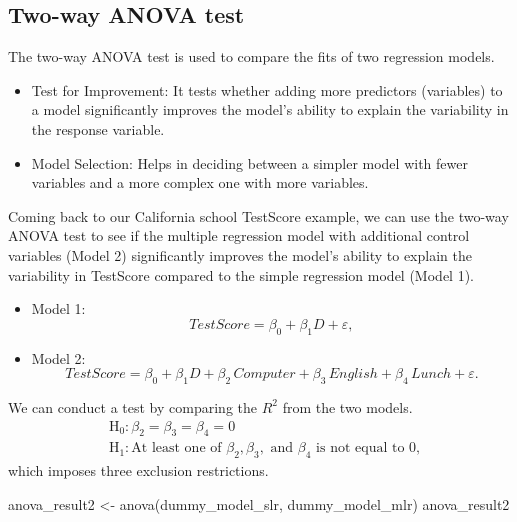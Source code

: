 \documentclass[
  12pt,
  a4paper,
]{scrbook}
\newenvironment{Shaded}{\begin{snugshade}}{\end{snugshade}}
\newcommand{\FunctionTok}[1]{\textcolor[rgb]{0.28,0.35,0.67}{#1}}
\newcommand{\NormalTok}[1]{\textcolor[rgb]{0.00,0.23,0.31}{#1}}
\newcommand{\OtherTok}[1]{\textcolor[rgb]{0.00,0.23,0.31}{#1}}
\providecommand{\tightlist}{%
  \setlength{\itemsep}{0pt}\setlength{\parskip}{0pt}}
\renewcommand{\tightlist}{\setlength{\itemsep}{0.5\baselineskip}\setlength{\parskip}{0.2\baselineskip}}
\theoremstyle{plain}
\theoremstyle{definition}
\theoremstyle{remark}
\begin{document}
\subsection{Two-way ANOVA test}\label{two-way-anova-test}

The two-way ANOVA test is used to compare the fits of two regression
models.

\begin{itemize}
\item
  Test for Improvement: It tests whether adding more predictors
  (variables) to a model significantly improves the model's ability to
  explain the variability in the response variable.
\item
  Model Selection: Helps in deciding between a simpler model with fewer
  variables and a more complex one with more variables.
\end{itemize}

Coming back to our California school TestScore example, we can use the
two-way ANOVA test to see if the multiple regression model with
additional control variables (Model 2) significantly improves the
model's ability to explain the variability in TestScore compared to the
simple regression model (Model 1).

\begin{itemize}
\tightlist
\item
  Model 1: \[
  TestScore = \beta_0 + \beta_1 D + \varepsilon,
  \]
\item
  Model 2:
  \[TestScore = \beta_0 + \beta_1 D + \beta_2\, Computer + \beta_3\, English + \beta_4\, Lunch + \varepsilon .
  \]
\end{itemize}

We can conduct a test by comparing the \(R^2\) from the two models. \[
\begin{aligned}
&\text{H}_0: \beta_2 = \beta_3 = \beta_4 = 0 \\
&\text{H}_1: \text{At least one of }\beta_2, \beta_3, \text{ and } \beta_4 \text{ is not equal to } 0 ,
\end{aligned}
\] which imposes three exclusion restrictions.

\begin{Shaded}
\begin{Highlighting}[]
\NormalTok{anova\_result2 }\OtherTok{\textless{}{-}} \FunctionTok{anova}\NormalTok{(dummy\_model\_slr, dummy\_model\_mlr)}
\NormalTok{anova\_result2}
\end{Highlighting}
\end{Shaded}
\end{document}
